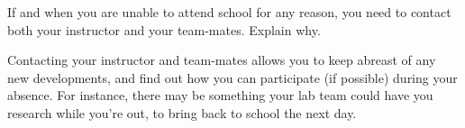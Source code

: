

If and when you are unable to attend school for any reason, you need to contact both your instructor and your team-mates.  Explain why.







Contacting your instructor and team-mates allows you to keep abreast of any new developments, and find out how you can participate (if possible) during your absence.  For instance, there may be something your lab team could have you research while you're out, to bring back to school the next day.












